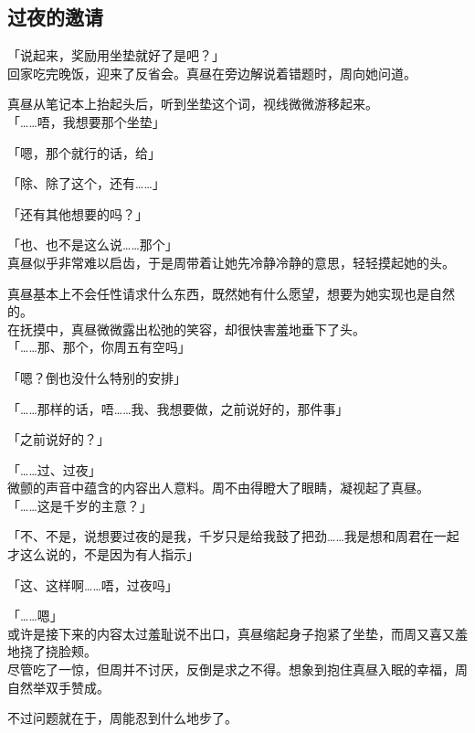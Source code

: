 \subsection{过夜的邀请}

「说起来，奖励用坐垫就好了是吧？」\\

回家吃完晚饭，迎来了反省会。真昼在旁边解说着错题时，周向她问道。

真昼从笔记本上抬起头后，听到坐垫这个词，视线微微游移起来。\\

「……唔，我想要那个坐垫」

「嗯，那个就行的话，给」

「除、除了这个，还有……」

「还有其他想要的吗？」

「也、也不是这么说……那个」\\

真昼似乎非常难以启齿，于是周带着让她先冷静冷静的意思，轻轻摸起她的头。

真昼基本上不会任性请求什么东西，既然她有什么愿望，想要为她实现也是自然的。\\

在抚摸中，真昼微微露出松弛的笑容，却很快害羞地垂下了头。\\

「……那、那个，你周五有空吗」

「嗯？倒也没什么特别的安排」

「……那样的话，唔……我、我想要做，之前说好的，那件事」

「之前说好的？」

「……过、过夜」\\

微颤的声音中蕴含的内容出人意料。周不由得瞪大了眼睛，凝视起了真昼。\\

「……这是千岁的主意？」

「不、不是，说想要过夜的是我，千岁只是给我鼓了把劲……我是想和周君在一起才这么说的，不是因为有人指示」

「这、这样啊……唔，过夜吗」

「……嗯」\\

或许是接下来的内容太过羞耻说不出口，真昼缩起身子抱紧了坐垫，而周又喜又羞地挠了挠脸颊。\\

尽管吃了一惊，但周并不讨厌，反倒是求之不得。想象到抱住真昼入眠的幸福，周自然举双手赞成。

不过问题就在于，周能忍到什么地步了。\\

